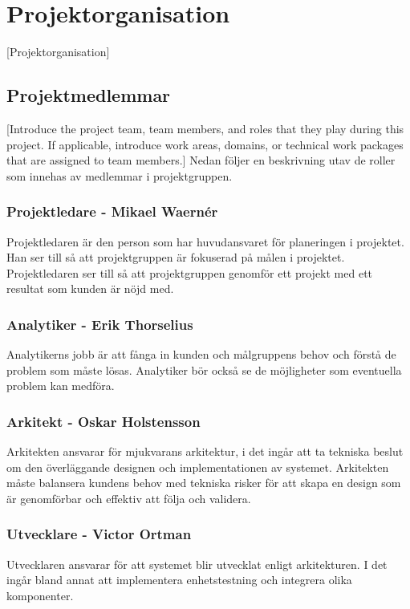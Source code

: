 \section{Projektorganisation}
[Projektorganisation]

\subsection{Projektmedlemmar}
[Introduce the project team, team members, and roles that they play during this project. If applicable, introduce work areas, domains, or technical work packages that are assigned to team members.]
Nedan följer en beskrivning utav de roller som innehas av medlemmar i projektgruppen.

\subsubsection*{Projektledare - Mikael Waernér}
Projektledaren är den person som har huvudansvaret för planeringen i projektet. Han ser till så att projektgruppen är fokuserad på målen i projektet. Projektledaren ser till så att projektgruppen genomför ett projekt med ett resultat som kunden är nöjd med.

\subsubsection*{Analytiker - Erik Thorselius}
Analytikerns jobb är att fånga in kunden och målgruppens behov och förstå de problem som måste lösas. Analytiker bör också se de möjligheter som eventuella problem kan medföra.

\subsubsection*{Arkitekt - Oskar Holstensson}
Arkitekten ansvarar för mjukvarans arkitektur, i det ingår att ta tekniska beslut om den överläggande designen och implementationen av systemet. Arkitekten måste balansera kundens behov med tekniska risker för att skapa en design som är genomförbar och effektiv att följa och validera.

\subsubsection*{Utvecklare - Victor Ortman}
Utvecklaren ansvarar för att systemet blir utvecklat enligt arkitekturen. I det ingår bland annat att implementera enhetstestning och integrera olika komponenter.

